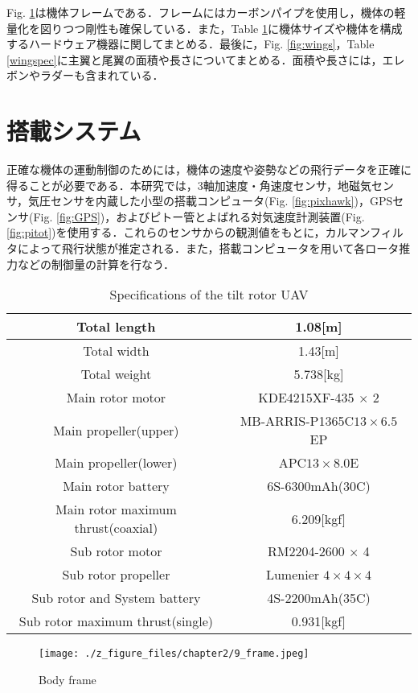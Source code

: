 Fig. \ref{fig:frame}は機体フレームである．フレームにはカーボンパイプを使用し，機体の軽量化を図りつつ剛性も確保している．また，Table \ref{spec}に機体サイズや機体を構成するハードウェア機器に関してまとめる．最後に，Fig. \ref{fig:wings}，Table \ref{wingspec}に主翼と尾翼の面積や長さについてまとめる．面積や長さには，エレボンやラダーも含まれている．

\section{搭載システム}

正確な機体の運動制御のためには，機体の速度や姿勢などの飛行データを正確に得ることが必要である．本研究では，3軸加速度・角速度センサ，地磁気センサ，気圧センサを内蔵した小型の搭載コンピュータ(Fig. \ref{fig:pixhawk})，GPSセンサ(Fig. \ref{fig:GPS})，およびピトー管とよばれる対気速度計測装置(Fig. \ref{fig:pitot})を使用する．これらのセンサからの観測値をもとに，カルマンフィルタによって飛行状態が推定される．また，搭載コンピュータを用いて各ロータ推力などの制御量の計算を行なう．
\begin{table}[htb]
	\begin{center}
		\caption{Specifications of the tilt rotor UAV}
		\label{spec}
		\begin{tabular}{|c|c|}\hline
			Total length & 1.08[m] \\ \hline
			Total width & 1.43[m] \\ \hline
			Total weight & 5.738[kg]\\ \hline
			Main rotor motor & KDE4215XF-435 $\times$ 2\\ \hline
			Main propeller(upper) & MB-ARRIS-P1365C$13 \times 6.5$EP\\ \hline
			Main propeller(lower) & APC$13 \times 8.0$E\\ \hline
			Main rotor battery & 6S-6300mAh(30C)\\ \hline
			Main rotor maximum thrust(coaxial) & 6.209[kgf]\\ \hline
			Sub rotor motor & RM2204-2600 $\times$ 4\\ \hline
			Sub rotor propeller & Lumenier $4 \times 4 \times 4$\\ \hline
			Sub rotor and System battery & 4S-2200mAh(35C)\\ \hline
			Sub rotor maximum thrust(single) & 0.931[kgf]\\ \hline
		\end{tabular}
	\end{center}
\end{table}
\begin{figure}[hb]
	\begin{center}
		\texttt{[image: ./z\_figure\_files/chapter2/9\_frame.jpeg]}
		\caption{Body frame}
		\label{fig:frame}
	\end{center}
\end{figure}

